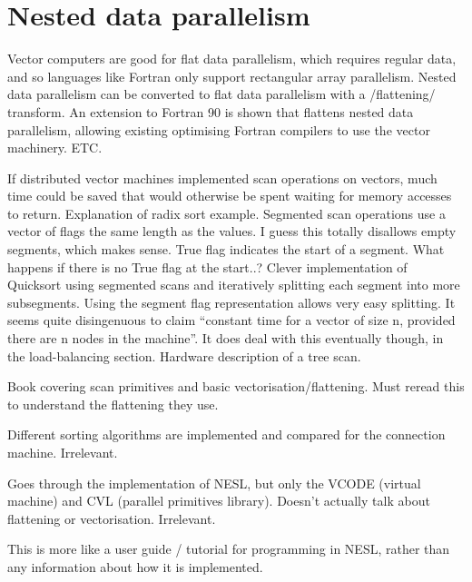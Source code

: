 \section{Nested data parallelism}

Vector computers are good for flat data parallelism, which requires regular data, and so languages like Fortran only support rectangular array parallelism. Nested data parallelism can be converted to flat data parallelism with a /flattening/ transform. An extension to Fortran 90 is shown that flattens nested data parallelism, allowing existing optimising Fortran compilers to use the vector machinery.
ETC.

If distributed vector machines implemented scan operations on vectors, much time could be saved that would otherwise be spent waiting for memory accesses to return.
Explanation of radix sort example.
Segmented scan operations use a vector of flags the same length as the values. I guess this totally disallows empty segments, which makes sense. True flag indicates the start of a segment. What happens if there is no True flag at the start..?
Clever implementation of Quicksort using segmented scans and iteratively splitting each segment into more subsegments. Using the segment flag representation allows very easy splitting.
It seems quite disingenuous to claim ``constant time for a vector of size n, provided there are n nodes in the machine''. It does deal with this eventually though, in the load-balancing section.
Hardware description of a tree scan.

Book covering scan primitives and basic vectorisation/flattening.
Must reread this to understand the flattening they use.

Different sorting algorithms are implemented and compared for the connection machine. Irrelevant.

Goes through the implementation of NESL, but only the VCODE (virtual machine) and CVL (parallel primitives library).
Doesn't actually talk about flattening or vectorisation.
Irrelevant.

This is more like a user guide / tutorial for programming in NESL, rather than any information about how it is implemented.


